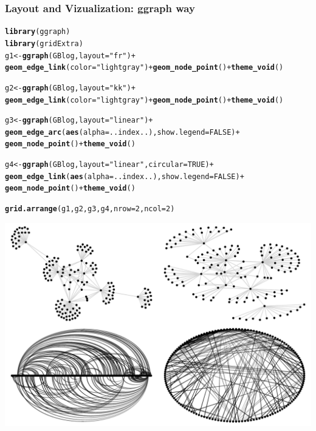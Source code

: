 \documentclass{beamer}\usepackage[]{graphicx}\usepackage[]{color}
\makeatletter
\newcommand{\hlnum}[1]{\textcolor[rgb]{0.686,0.059,0.569}{#1}}%
\newcommand{\hlstr}[1]{\textcolor[rgb]{0.192,0.494,0.8}{#1}}%
\newcommand{\hlopt}[1]{\textcolor[rgb]{0,0,0}{#1}}%
\newcommand{\hlstd}[1]{\textcolor[rgb]{0.345,0.345,0.345}{#1}}%
\newcommand{\hlkwb}[1]{\textcolor[rgb]{0.69,0.353,0.396}{#1}}%
\newcommand{\hlkwc}[1]{\textcolor[rgb]{0.333,0.667,0.333}{#1}}%
\newcommand{\hlkwd}[1]{\textcolor[rgb]{0.737,0.353,0.396}{\textbf{#1}}}%
\newenvironment{kframe}{%
 \def\at@end@of@kframe{}%
 \ifinner\ifhmode%
  \def\at@end@of@kframe{\end{minipage}}%
  \begin{minipage}{\columnwidth}%
 \fi\fi%
 \def\FrameCommand##1{\hskip\@totalleftmargin \hskip-\fboxsep
 \colorbox{shadecolor}{##1}\hskip-\fboxsep
     \hskip-\linewidth \hskip-\@totalleftmargin \hskip\columnwidth}%
 \MakeFramed {\advance\hsize-\width
   \@totalleftmargin\z@ \linewidth\hsize
   \@setminipage}}%
 {\par\unskip\endMakeFramed%
 \at@end@of@kframe}
\newenvironment{knitrout}{}{} %
\makeatother
\begin{document}
\begin{frame}
  \frametitle{Layout and Vizualization: \textbf{ggraph} way}
 
\begin{knitrout}\scriptsize
{}\color{fgcolor}\begin{kframe}
\begin{alltt}
\hlkwd{library}\hlstd{(ggraph)}
\hlkwd{library}\hlstd{(gridExtra)}
\hlstd{g1} \hlkwb{<-} \hlkwd{ggraph}\hlstd{(GBlog,} \hlkwc{layout} \hlstd{=} \hlstr{"fr"}\hlstd{)} \hlopt{+}
  \hlkwd{geom_edge_link}\hlstd{(}\hlkwc{color} \hlstd{=} \hlstr{"lightgray"}\hlstd{)} \hlopt{+} \hlkwd{geom_node_point}\hlstd{()} \hlopt{+} \hlkwd{theme_void}\hlstd{()}

\hlstd{g2} \hlkwb{<-} \hlkwd{ggraph}\hlstd{(GBlog   ,} \hlkwc{layout} \hlstd{=} \hlstr{"kk"}\hlstd{)} \hlopt{+}
  \hlkwd{geom_edge_link}\hlstd{(}\hlkwc{color} \hlstd{=} \hlstr{"lightgray"}\hlstd{)} \hlopt{+} \hlkwd{geom_node_point}\hlstd{()} \hlopt{+} \hlkwd{theme_void}\hlstd{()}

\hlstd{g3} \hlkwb{<-} \hlkwd{ggraph}\hlstd{(GBlog,} \hlkwc{layout} \hlstd{=} \hlstr{"linear"}\hlstd{)} \hlopt{+}
  \hlkwd{geom_edge_arc}\hlstd{(}\hlkwd{aes}\hlstd{(}\hlkwc{alpha}\hlstd{=..index..),} \hlkwc{show.legend} \hlstd{=} \hlnum{FALSE}\hlstd{)} \hlopt{+}
  \hlkwd{geom_node_point}\hlstd{()} \hlopt{+} \hlkwd{theme_void}\hlstd{()}

\hlstd{g4} \hlkwb{<-} \hlkwd{ggraph}\hlstd{(GBlog   ,} \hlkwc{layout} \hlstd{=} \hlstr{"linear"}\hlstd{,} \hlkwc{circular} \hlstd{=} \hlnum{TRUE}\hlstd{)} \hlopt{+}
  \hlkwd{geom_edge_link}\hlstd{(}\hlkwd{aes}\hlstd{(}\hlkwc{alpha}\hlstd{=..index..),} \hlkwc{show.legend} \hlstd{=} \hlnum{FALSE}\hlstd{)} \hlopt{+}
  \hlkwd{geom_node_point}\hlstd{()} \hlopt{+} \hlkwd{theme_void}\hlstd{()}

\hlkwd{grid.arrange}\hlstd{(g1, g2, g3, g4,} \hlkwc{nrow} \hlstd{=} \hlnum{2}\hlstd{,} \hlkwc{ncol} \hlstd{=} \hlnum{2}\hlstd{)}
\end{alltt}
\end{kframe}
\includegraphics[width=.8\textwidth]{figures/ggraph_vizu_1-1} 

\end{knitrout}
\end{frame}
\end{document}
